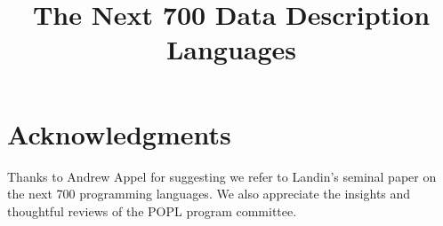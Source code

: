 \documentclass[nocopyrightspace]{sigplanconf}
\begin{document}
\title{The Next 700 Data Description Languages}
       {}

       {}
       {}



\maketitle{}

\begin{abstract}  

\end{abstract}
















%



\section*{Acknowledgments}

Thanks to Andrew Appel for
suggesting we refer to Landin's seminal paper on
the next 700 programming languages.  We also appreciate
the insights and thoughtful reviews of the POPL program 
committee.





\end{document}
